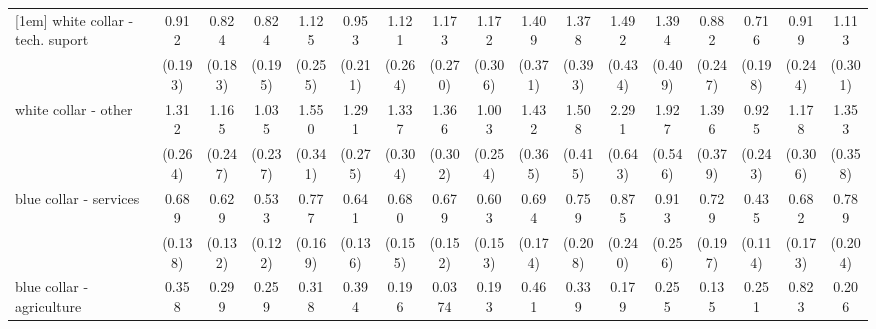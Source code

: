 {\begin{tabular}{l*{16}{c}}
[1em]
white collar - tech. suport&       0.912         &       0.824         &       0.824         &       1.125         &       0.953         &       1.121         &       1.173         &       1.172         &       1.409         &       1.378         &       1.492         &       1.394         &       0.882         &       0.716         &       0.919         &       1.113         \\
                    &     (0.193)         &     (0.183)         &     (0.195)         &     (0.255)         &     (0.211)         &     (0.264)         &     (0.270)         &     (0.306)         &     (0.371)         &     (0.393)         &     (0.434)         &     (0.409)         &     (0.247)         &     (0.198)         &     (0.244)         &     (0.301)         \\
[1em]
white collar - other&       1.312         &       1.165         &       1.035         &       1.550\sym{*}  &       1.291         &       1.337         &       1.366         &       1.003         &       1.432         &       1.508         &       2.291\sym{**} &       1.927\sym{*}  &       1.396         &       0.925         &       1.178         &       1.353         \\
                    &     (0.264)         &     (0.247)         &     (0.237)         &     (0.341)         &     (0.275)         &     (0.304)         &     (0.302)         &     (0.254)         &     (0.365)         &     (0.415)         &     (0.643)         &     (0.546)         &     (0.379)         &     (0.243)         &     (0.306)         &     (0.358)         \\
[1em]
blue collar - services&       0.689         &       0.629\sym{*}  &       0.533\sym{**} &       0.777         &       0.641\sym{*}  &       0.680         &       0.679         &       0.603\sym{*}  &       0.694         &       0.759         &       0.875         &       0.913         &       0.729         &       0.435\sym{**} &       0.682         &       0.789         \\
                    &     (0.138)         &     (0.132)         &     (0.122)         &     (0.169)         &     (0.136)         &     (0.155)         &     (0.152)         &     (0.153)         &     (0.174)         &     (0.208)         &     (0.240)         &     (0.256)         &     (0.197)         &     (0.114)         &     (0.173)         &     (0.204)         \\
[1em]
blue collar - agriculture&       0.358         &       0.299         &       0.259\sym{*}  &       0.318         &       0.394         &       0.196\sym{*}  &      0.0374\sym{***}&       0.193\sym{**} &       0.461         &       0.339         &       0.179\sym{*}  &       0.255         &       0.135\sym{*}  &       0.251\sym{*}  &       0.823         &       0.206\sym{**} \\

\end{tabular}}
